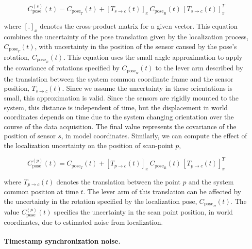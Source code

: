 \documentclass[12pt,onecolumn,oneside]{book}
\begin{document}
\begin{equation}
C^{(s)}_{\mathrm{pose}}(t) = C_{\mathrm{pose}_T}(t) + \left[ T_{s\rightarrow c}(t) \right]_x \, C_{\mathrm{pose}_R}(t) \, \left[ T_{s\rightarrow c}(t) \right]_x^T
\end{equation}

\noindent where $\left[.\right]_x$ denotes the cross-product matrix for a given vector.  This equation combines the uncertainty of the pose translation given by the localization process, $C_{\mathrm{pose}_T}(t)$, with uncertainty in the position of the sensor caused by the pose's rotation, $C_{\mathrm{pose}_R}(t)$.  This equation uses the small-angle approximation to apply the covariance of rotations specified by $C_{\mathrm{pose}_R}(t)$ to the lever arm described by the translation between the system common coordinate frame and the sensor position, $T_{s\rightarrow c}(t)$.  Since we assume the uncertainty in these orientations is small, this approximation is valid.  Since the sensors are rigidly mounted to the system, this distance is independent of time, but the displacement in world coordinates depends on time due to the system changing orientation over the course of the data acquisition.  The final value represents the covariance of the position of sensor $s$, in model coordinates.  Similarly, we can compute the effect of the localization  uncertainty on the position of scan-point $p$,

\begin{equation}
C^{(p)}_{\mathrm{pose}}(t) = C_{\mathrm{pose}_T}(t) + \left[ T_{p\rightarrow c}(t) \right]_x \, C_{\mathrm{pose}_R}(t) \, \left[ T_{p\rightarrow c}(t) \right]_x^T
\end{equation}

\noindent where $T_{p\rightarrow c}(t)$ denotes the translation between the point $p$ and the system common position at time $t$.  The lever arm of this translation can be affected by the uncertainty in the rotation specified by the localization pose, $C_{\mathrm{pose}_R}(t)$.  The value $C^{(p)}_{\mathrm{pose}}(t)$ specifies the uncertainty in the scan point position, in world coordinates, due to estimated noise from localization.

\paragraph*{Timestamp synchronization noise.}
\end{document}
